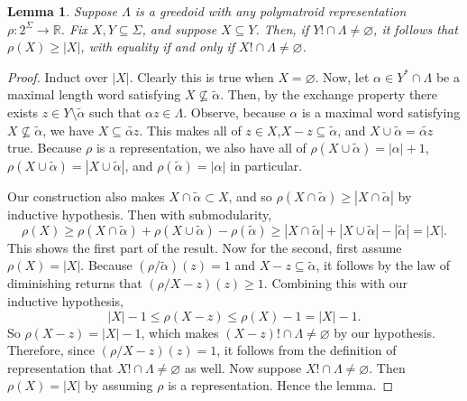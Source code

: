 \documentclass[11pt]{article}
\newtheorem{lemma}[theorem]{Lemma}
\newcommand{\univ}{\Sigma}
\newcommand{\glang}{\Lambda}
\begin{document}
\begin{lemma}\label{lem:std}
    Suppose $\glang$ is a greedoid with any polymatroid representation $\rho:2^\univ\to\mathbb{R}$.
    Fix $X,Y\subseteq\univ$, and suppose $X\subseteq Y$.
    Then, if $Y!\cap\glang\neq\varnothing$, it follows that $\rho(X) \geq |X|$, with equality if and only if $X!\cap\glang\neq\varnothing$.
\end{lemma}
\begin{proof}
    Induct over $|X|$.
    Clearly this is true when $X=\varnothing$.
    Now, let $\alpha \in Y^*\cap\glang$ be a maximal length word satisfying $X\not\subseteq \widetilde{\alpha}$.
    Then, by the exchange property there exists $z \in Y\setminus \widetilde{\alpha}$ such that $\alpha z \in\glang$.
    Observe, because $\alpha$ is a maximal word satisfying $X\not\subseteq\widetilde{\alpha}$, we have $X\subseteq\widetilde{\alpha z}$.
    This makes all of $z \in X$,$X - z \subseteq\widetilde{\alpha}$, and
    $X\cup\widetilde{\alpha} = \widetilde{\alpha z}$ true.
    Because $\rho$ is a representation, we also have all of $\rho(X\cup\widetilde{\alpha}) = |\alpha| + 1$, $\rho(X\cup\widetilde{\alpha}) = |X\cup\widetilde{\alpha}|$, and $\rho(\widetilde{\alpha}) = |\alpha|$ in particular.

    Our construction also makes $X\cap\widetilde{\alpha} \subset X$, and so $\rho(X\cap\widetilde{\alpha}) \geq |X\cap\widetilde{\alpha}|$ by inductive hypothesis.
    Then with submodularity,
    \begin{equation}\label{eq:uiuitsi}
        \rho(X) \geq \rho(X\cap\widetilde{\alpha}) + \rho(X\cup\widetilde{\alpha}) - \rho(\widetilde{\alpha}) \geq |X\cap\widetilde{\alpha}| + |X\cup\widetilde{\alpha}| - |\widetilde{\alpha}| = |X|.
    \end{equation}
    This shows the first part of the result.
    Now for the second, first assume $\rho(X) = |X|$.
    Because $(\rho/\widetilde{\alpha})(z) = 1$ and $X-z\subseteq\widetilde{\alpha}$, it follows by the law of diminishing returns that $(\rho/X-z)(z)\geq 1$.
    Combining this with our inductive hypothesis,
    \[
        |X| - 1 \leq \rho(X-z) \leq \rho(X) - 1 = |X| - 1.
    \]
    So $\rho(X-z) = |X| -1$, which makes $(X-z)!\cap\glang\neq\varnothing$ by our hypothesis.
    Therefore, since $(\rho/X-z)(z) = 1$, it follows from the definition of representation that $X!\cap\glang\neq\varnothing$ as well.
    Now suppose $X!\cap\glang\neq\varnothing$.
    Then $\rho(X) = |X|$ by assuming $\rho$ is a representation.
    Hence the lemma.
\end{proof}
\end{document}
